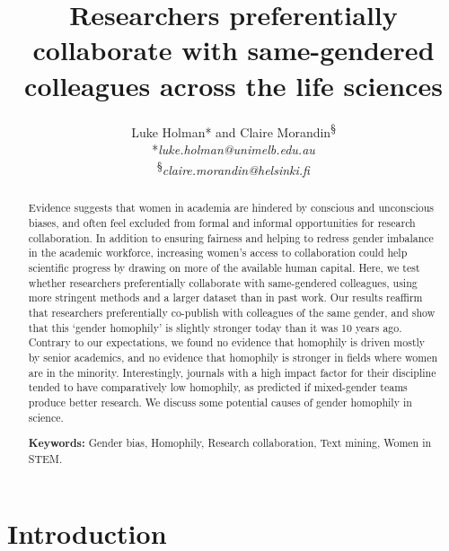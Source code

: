 \documentclass[12pt,]{article}
\title{Researchers preferentially collaborate with same-gendered colleagues
across the life sciences}
\author{Luke Holman* and Claire Morandin\textsuperscript{§} \\ *\textit{luke.holman@unimelb.edu.au} \\ \textsuperscript{§}\textit{claire.morandin@helsinki.fi} \vspace{5mm}}
\date{}
\begin{document}
\maketitle
\begin{abstract}
Evidence suggests that women in academia are hindered by conscious and
unconscious biases, and often feel excluded from formal and informal
opportunities for research collaboration. In addition to ensuring
fairness and helping to redress gender imbalance in the academic
workforce, increasing women's access to collaboration could help
scientific progress by drawing on more of the available human capital.
Here, we test whether researchers preferentially collaborate with
same-gendered colleagues, using more stringent methods and a larger
dataset than in past work. Our results reaffirm that researchers
preferentially co-publish with colleagues of the same gender, and show
that this `gender homophily' is slightly stronger today than it was 10
years ago. Contrary to our expectations, we found no evidence that
homophily is driven mostly by senior academics, and no evidence that
homophily is stronger in fields where women are in the minority.
Interestingly, journals with a high impact factor for their discipline
tended to have comparatively low homophily, as predicted if mixed-gender
teams produce better research. We discuss some potential causes of
gender homophily in science. \vspace{5mm}
\par\noindent \textbf{Keywords:} Gender bias, Homophily, Research
collaboration, Text mining, Women in STEM.
\end{abstract}

\maketitle

\maketitle{}

\newpage

\section{Introduction}\label{introduction}
\end{document}
